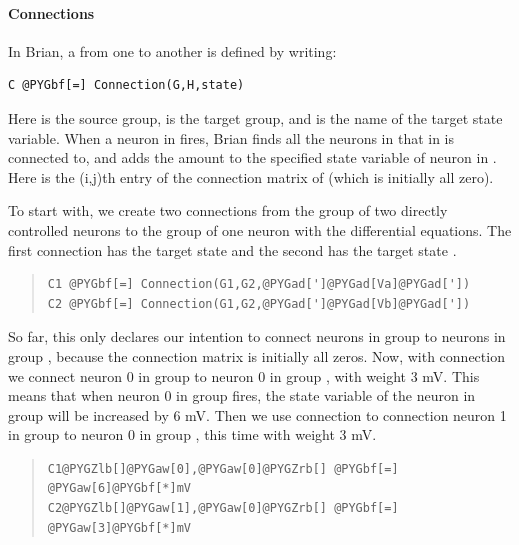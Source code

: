 \documentclass[letterpaper,10pt,english]{manual}
\begin{document}
\paragraph{Connections}

In Brian, a \hyperlink{brian.Connection}{} from one \hyperlink{brian.NeuronGroup}{} to another is
defined by writing:

\begin{Verbatim}[commandchars=@\[\]]
C @PYGbf[=] Connection(G,H,state)
\end{Verbatim}

Here  is the source group,  is the target group, and  is the
name of the target state variable. When a neuron  in  fires, Brian
finds all the neurons  in  that  in  is connected to, and adds
the amount  to the specified state variable of neuron  in .
Here  is the (i,j)th entry of the connection matrix of  (which
is initially all zero).

To start with, we create two connections from the group of two
directly controlled neurons to the group of one neuron with the
differential equations. The first connection has the target state 
and the second has the target state .
\begin{quote}

\begin{Verbatim}[commandchars=@\[\]]
C1 @PYGbf[=] Connection(G1,G2,@PYGad[']@PYGad[Va]@PYGad['])
C2 @PYGbf[=] Connection(G1,G2,@PYGad[']@PYGad[Vb]@PYGad['])
\end{Verbatim}
\end{quote}

So far, this only declares our intention to connect neurons in group
 to neurons in group , because the connection matrix is initially
all zeros. Now, with connection  we connect neuron 0 in group 
to neuron 0 in group , with weight 3 mV. This means that when neuron
0 in group  fires, the state variable  of the neuron in group 
will be increased by 6 mV. Then we use connection  to connection
neuron 1 in group  to neuron 0 in group , this time with weight
3 mV.
\begin{quote}

\begin{Verbatim}[commandchars=@\[\]]
C1@PYGZlb[]@PYGaw[0],@PYGaw[0]@PYGZrb[] @PYGbf[=] @PYGaw[6]@PYGbf[*]mV
C2@PYGZlb[]@PYGaw[1],@PYGaw[0]@PYGZrb[] @PYGbf[=] @PYGaw[3]@PYGbf[*]mV
\end{Verbatim}
\end{quote}
\end{document}
